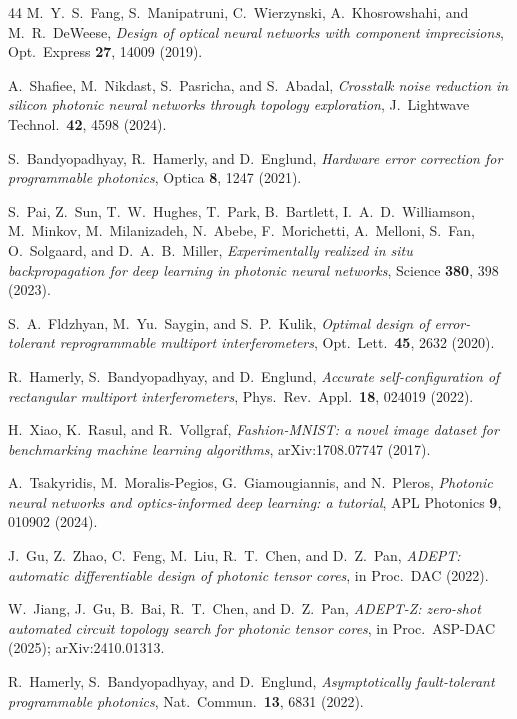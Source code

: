 \documentclass[11pt,a4paper]{article}
\begin{document}
\begin{thebibliography}{44}
M.~Y.~S.~Fang, S.~Manipatruni, C.~Wierzynski, A.~Khosrowshahi, and M.~R.~DeWeese,
\textit{Design of optical neural networks with component imprecisions},
Opt.\ Express \textbf{27}, 14009 (2019).

A.~Shafiee, M.~Nikdast, S.~Pasricha, and S.~Abadal,
\textit{Crosstalk noise reduction in silicon photonic neural networks through topology exploration},
J.\ Lightwave Technol.\ \textbf{42}, 4598 (2024).

S.~Bandyopadhyay, R.~Hamerly, and D.~Englund,
\textit{Hardware error correction for programmable photonics},
Optica \textbf{8}, 1247 (2021).

S.~Pai, Z.~Sun, T.~W.~Hughes, T.~Park, B.~Bartlett, I.~A.~D.~Williamson, M.~Minkov, M.~Milanizadeh, N.~Abebe, F.~Morichetti, A.~Melloni, S.~Fan, O.~Solgaard, and D.~A.~B.~Miller,
\textit{Experimentally realized in situ backpropagation for deep learning in photonic neural networks},
Science \textbf{380}, 398 (2023).

S.~A.~Fldzhyan, M.~Yu.~Saygin, and S.~P.~Kulik,
\textit{Optimal design of error-tolerant reprogrammable multiport interferometers},
Opt.\ Lett.\ \textbf{45}, 2632 (2020).

R.~Hamerly, S.~Bandyopadhyay, and D.~Englund,
\textit{Accurate self-configuration of rectangular multiport interferometers},
Phys.\ Rev.\ Appl.\ \textbf{18}, 024019 (2022).

H.~Xiao, K.~Rasul, and R.~Vollgraf,
\textit{Fashion-MNIST: a novel image dataset for benchmarking machine learning algorithms},
arXiv:1708.07747 (2017).

A.~Tsakyridis, M.~Moralis-Pegios, G.~Giamougiannis, and N.~Pleros,
\textit{Photonic neural networks and optics-informed deep learning: a tutorial},
APL Photonics \textbf{9}, 010902 (2024).

J.~Gu, Z.~Zhao, C.~Feng, M.~Liu, R.~T.~Chen, and D.~Z.~Pan,
\textit{ADEPT: automatic differentiable design of photonic tensor cores},
in Proc.\ DAC (2022).

W.~Jiang, J.~Gu, B.~Bai, R.~T.~Chen, and D.~Z.~Pan,
\textit{ADEPT-Z: zero-shot automated circuit topology search for photonic tensor cores},
in Proc.\ ASP-DAC (2025); arXiv:2410.01313.

R.~Hamerly, S.~Bandyopadhyay, and D.~Englund,
\textit{Asymptotically fault-tolerant programmable photonics},
Nat.\ Commun.\ \textbf{13}, 6831 (2022).


\end{thebibliography}
\end{document}
